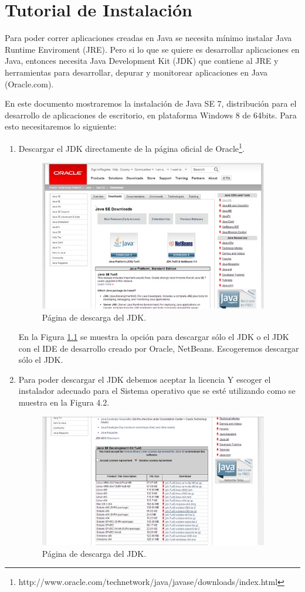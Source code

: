 \documentclass[12pt]{book} %
\begin{document}
\chapter{Tutorial de Instalación}
Para poder correr aplicaciones creadas en Java se necesita mínimo instalar Java Runtime Enviroment (JRE). Pero si lo que se quiere es desarrollar aplicaciones en Java, entonces necesita Java Development Kit (JDK) que contiene al JRE y herramientas para desarrollar, depurar y monitorear aplicaciones en Java (Oracle.com).

En este documento mostraremos la instalación  de Java SE 7, distribución para el desarrollo de aplicaciones de escritorio, en plataforma Windows 8 de 64bits. Para esto necesitaremos lo siguiente:

\begin{enumerate}
\item Descargar el JDK directamente de la página oficial de Oracle\footnote{http://www.oracle.com/technetwork/java/javase/downloads/index.html}.

\begin{figure}[!hbp]
		\centering
			\includegraphics[width=10cm]{ins1.jpg}
			\caption{Página de descarga del JDK.}
			\label{fig1}
		
	\end{figure}
En la Figura \ref{fig1} se muestra la opción para descargar sólo el JDK o el JDK con el IDE de desarrollo creado por Oracle, NetBeans. Escogeremos descargar sólo el JDK.
	
	
	
\item Para poder descargar el JDK debemos aceptar la licencia Y escoger el instalador adecuado para el Sistema operativo que se esté utilizando como se muestra en la Figura 4.2.

	\begin{figure}[!hbp]
		\centering
			\includegraphics[width=10cm]{ins2.jpg}
			\caption{Página de descarga del JDK.}
		

\end{figure}
\end{enumerate}
\end{document}

